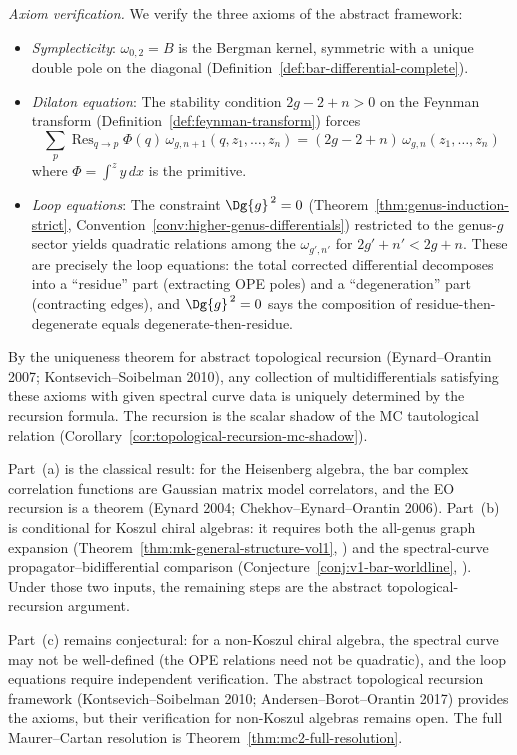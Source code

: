\begin{remark}
\emph{Axiom verification.}
We verify the three axioms of the abstract framework:
\begin{itemize}
\item \emph{Symplecticity}: $\omega_{0,2} = B$ is the Bergman kernel,
symmetric with a unique double pole on the diagonal
(Definition~\ref{def:bar-differential-complete}).

\item \emph{Dilaton equation}: The stability condition
$2g - 2 + n > 0$ on the Feynman transform
(Definition~\ref{def:feynman-transform}) forces
\[
\textstyle\sum_{p} \operatorname{Res}_{q \to p} \Phi(q)\,
\omega_{g,n+1}(q, z_1, \ldots, z_n)
= (2g{-}2{+}n)\,\omega_{g,n}(z_1,\ldots,z_n)
\]
where $\Phi = \int^z y\,dx$ is the primitive.

\item \emph{Loop equations}: The constraint $\Dg{g}^{\,2} = 0$
(Theorem~\ref{thm:genus-induction-strict},
Convention~\ref{conv:higher-genus-differentials}) restricted to the
genus-$g$ sector yields quadratic relations among the
$\omega_{g',n'}$ for $2g'+n' < 2g+n$. These are precisely
the loop equations: the total corrected differential decomposes
into a ``residue'' part (extracting OPE poles) and a
``degeneration'' part (contracting edges), and $\Dg{g}^{\,2} = 0$ says
the composition of residue-then-degenerate equals
degenerate-then-residue.
\end{itemize}

By the uniqueness theorem for abstract topological recursion
(Eynard--Orantin 2007; Kontsevich--Soibelman 2010), any collection
of multidifferentials satisfying these axioms with given spectral
curve data is uniquely determined by the recursion formula.
The recursion is the scalar shadow of the MC tautological relation (Corollary~\ref{cor:topological-recursion-mc-shadow}).
\end{remark}

\begin{remark}[Scope]
Part~(a) is the classical result: for the Heisenberg algebra, the
bar complex correlation functions are Gaussian matrix model correlators,
and the EO recursion is a theorem (Eynard 2004;
Chekhov--Eynard--Orantin 2006). Part~(b) is conditional for Koszul
chiral algebras: it requires both the all-genus graph expansion
\textup{(}Theorem~\ref{thm:mk-general-structure-vol1},
\ClaimStatusConjectured\textup{)} and the spectral-curve
propagator--bidifferential comparison
\textup{(}Conjecture~\ref{conj:v1-bar-worldline},
\ClaimStatusHeuristic\textup{)}. Under those two inputs, the
remaining steps are the abstract topological-recursion argument.

Part~(c) remains conjectural: for a non-Koszul chiral
algebra, the spectral curve may not be well-defined (the OPE relations
need not be quadratic), and the loop equations require independent
verification. The abstract topological recursion framework
(Kontsevich--Soibelman 2010; Andersen--Borot--Orantin 2017) provides
the axioms, but their verification for non-Koszul algebras remains open.
The full Maurer--Cartan resolution is Theorem~\ref{thm:mc2-full-resolution}.
\end{remark}

